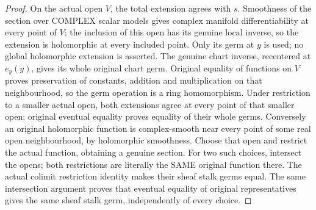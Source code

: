\begin{proof}
On the actual open $V$, the total extension agrees with $s$. Smoothness of
the section over COMPLEX scalar models gives complex manifold
differentiability at every point of $V$; the inclusion of this open has
its genuine local inverse, so the extension is holomorphic at every
included point. Only its germ at $y$ is used; no global holomorphic
extension is asserted. The genuine chart inverse, recentered at $e_y(y)$,
gives its whole original chart germ. Original equality of functions on
$V$ proves preservation of constants, addition and multiplication on
that neighbourhood, so the germ operation is a ring homomorphism. Under
restriction to a smaller actual open, both extensions agree at every point
of that smaller open; original eventual equality proves equality of their
whole germs. Conversely an original holomorphic function is complex-smooth
near every point of some real open neighbourhood, by holomorphic smoothness.
Choose that open and restrict the actual function, obtaining a genuine
section. For two such choices, intersect the opens; both restrictions are
literally the SAME original function there. The actual colimit restriction
identity makes their sheaf stalk germs equal. The same intersection
argument proves that eventual equality of original representatives gives
the same sheaf stalk germ, independently of every choice.
\end{proof}

